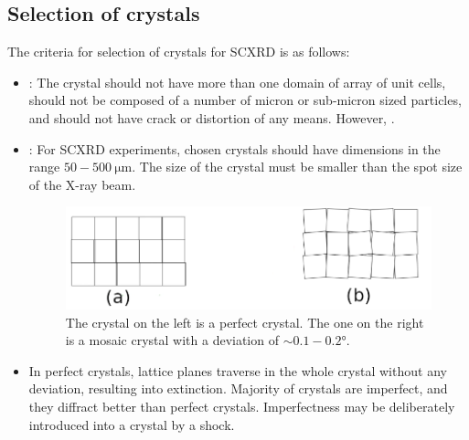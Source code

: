 \subsection{Selection of crystals}

The criteria for selection of crystals for SCXRD is as follows:%
%			
	\begin{itemize}%
%			
	    \item {}: The crystal should not have more than one domain of array of unit cells, should not be composed of a number of micron or sub-micron sized particles, and should not have crack or distortion of any means. However, .
	    
	    \item {}: For SCXRD experiments, chosen crystals should have dimensions in the range $50-500~\si{\micro\metre}.$ The size of the crystal must be smaller than the spot size of the X-ray beam.
	    
	    \begin{figure}
	    	\centering
	    	\includegraphics[scale=0.5]{imperfect_crystal.png}
	    	\caption{\label{fig:imperfect_crystal}The crystal on the left is a perfect crystal. The one on the right is a mosaic crystal with a deviation of $\sim 0.1-0.2 \si{\degree}.$}
	    \end{figure}
	    
	    \item {} In perfect crystals, lattice planes traverse in the whole crystal without any deviation, resulting into extinction. Majority of crystals are imperfect, and they diffract better than perfect crystals. Imperfectness may be deliberately introduced into a crystal by a shock.
	    

\end{itemize}
